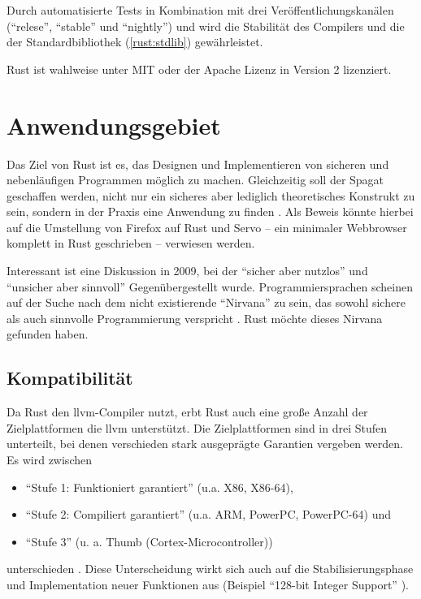 Durch automatisierte Tests  in Kombination mit drei Veröffentlichungskanälen (\enquote{relese}, \enquote{stable} und \enquote{nightly}) und  wird die Stabilität des Compilers und die der Standardbibliothek (\autoref{rust:stdlib}) gewährleistet.

Rust ist wahlweise unter MIT oder der Apache Lizenz in Version 2 lizenziert.

\section{Anwendungsgebiet}

Das Ziel von Rust ist es, das Designen und Implementieren von sicheren und nebenläufigen Programmen möglich zu machen.
Gleichzeitig soll der Spagat geschaffen werden, nicht nur ein sicheres aber lediglich theoretisches Konstrukt zu sein, sondern  in der Praxis eine Anwendung zu finden \cite{rust:faq}.
Als Beweis könnte hierbei auf die Umstellung von Firefox auf Rust und Servo -- ein minimaler Webbrowser komplett in Rust geschrieben -- verwiesen werden.

Interessant ist eine Diskussion in 2009, bei der \enquote{sicher aber nutzlos} und \enquote{unsicher aber sinnvoll} Gegenübergestellt wurde.
Programmiersprachen scheinen auf der Suche nach dem nicht existierende \enquote{Nirvana} zu sein, das sowohl sichere als auch sinnvolle Programmierung verspricht \cite[ab ca Minute 58:20]{rust:infoq:null}.
Rust möchte dieses Nirvana gefunden haben.

\subsection{Kompatibilität}
Da Rust den \gls{llvm}-Compiler nutzt, erbt Rust auch eine große Anzahl der Zielplattformen die \gls{llvm} unterstützt.
Die Zielplattformen sind in drei Stufen unterteilt, bei denen verschieden stark ausgeprägte Garantien vergeben werden. Es wird zwischen
\begin{itemize}
	\item \enquote{Stufe 1: Funktioniert garantiert} (u.a. X86, X86-64),
	\item \enquote{Stufe 2: Compiliert garantiert} (u.a. ARM, PowerPC, PowerPC-64) und
	\item \enquote{Stufe 3} (u. a. Thumb (Cortex-Microcontroller))
\end{itemize}
unterschieden \cite{rust:platform_support}.
Diese Unterscheidung wirkt sich auch auf die Stabilisierungsphase und Implementation neuer Funktionen aus (Beispiel \enquote{128-bit Integer Support} \cite{rust:github:128bit_integer}).

